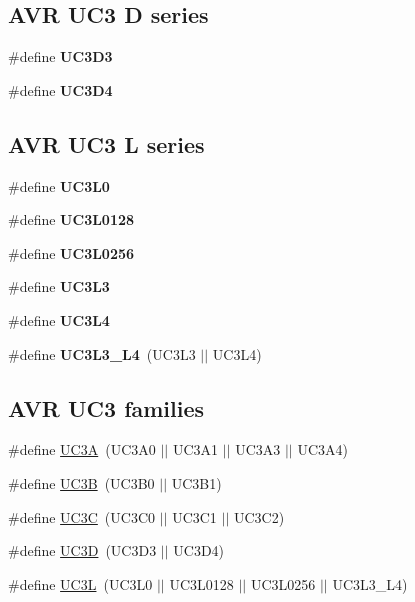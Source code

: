 \subsection*{A\+V\+R U\+C3 D series}
\begin{DoxyCompactItemize}
\item 
\#define {\bfseries U\+C3\+D3}
\item 
\#define {\bfseries U\+C3\+D4}
\end{DoxyCompactItemize}
\subsection*{A\+V\+R U\+C3 L series}
\begin{DoxyCompactItemize}
\item 
\#define {\bfseries U\+C3\+L0}
\item 
\#define {\bfseries U\+C3\+L0128}
\item 
\#define {\bfseries U\+C3\+L0256}
\item 
\#define {\bfseries U\+C3\+L3}
\item 
\#define {\bfseries U\+C3\+L4}
\item 
\hypertarget{group__uc3__part__macros__group_gae4dccd708991a86a5e8598b0c72d6bbd}{}\#define {\bfseries U\+C3\+L3\+\_\+\+L4}~(U\+C3\+L3 $\vert$$\vert$ U\+C3\+L4)\label{group__uc3__part__macros__group_gae4dccd708991a86a5e8598b0c72d6bbd}

\end{DoxyCompactItemize}
\subsection*{A\+V\+R U\+C3 families}
\begin{DoxyCompactItemize}
\item 
\#define \hyperlink{group__uc3__part__macros__group_gaf7f16cc2bde7daf34576983fee8824c8}{U\+C3\+A}~(U\+C3\+A0 $\vert$$\vert$ U\+C3\+A1 $\vert$$\vert$ U\+C3\+A3 $\vert$$\vert$ U\+C3\+A4)
\item 
\#define \hyperlink{group__uc3__part__macros__group_ga61e51606324c212eb11079e5acf592e0}{U\+C3\+B}~(U\+C3\+B0 $\vert$$\vert$ U\+C3\+B1)
\item 
\#define \hyperlink{group__uc3__part__macros__group_gac7a13b9ceb67804d94b6a8967512ee71}{U\+C3\+C}~(U\+C3\+C0 $\vert$$\vert$ U\+C3\+C1 $\vert$$\vert$ U\+C3\+C2)
\item 
\#define \hyperlink{group__uc3__part__macros__group_ga351a876f40669641e6ba9620909143d3}{U\+C3\+D}~(U\+C3\+D3 $\vert$$\vert$ U\+C3\+D4)
\item 
\#define \hyperlink{group__uc3__part__macros__group_gac8a7d715e500aa74cd05e0f0fc5bb005}{U\+C3\+L}~(U\+C3\+L0 $\vert$$\vert$ U\+C3\+L0128 $\vert$$\vert$ U\+C3\+L0256 $\vert$$\vert$ U\+C3\+L3\+\_\+\+L4)
\end{DoxyCompactItemize}


